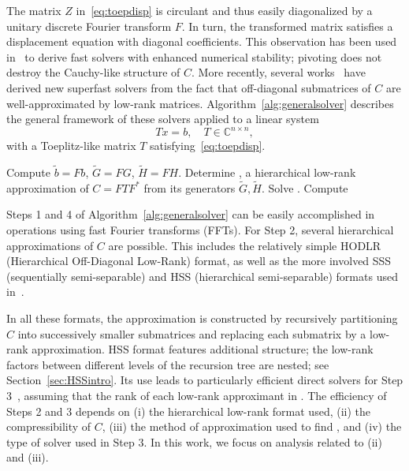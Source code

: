\documentclass[final,reqno,onefignum,onetabnum]{siamart190516}
\begin{document}
The matrix $Z$ in~\eqref{eq:toepdisp} is circulant and thus easily diagonalized by a unitary discrete Fourier transform $F$. In turn, the transformed matrix   satisfies a displacement equation with diagonal coefficients. This observation has been used in~\cite{gohberg1995fast} to derive fast solvers with enhanced numerical stability; pivoting does not destroy the Cauchy-like structure of $C$. More recently, several works~\cite{chandrasekaran2007superfast, martinsson2005fast, xia2012superfast} have derived new superfast solvers from the fact that off-diagonal submatrices of $C$ are well-approximated by low-rank matrices. Algorithm~\ref{alg:generalsolver} describes the general framework of these solvers applied to a linear system
\begin{equation}
\label{eq:tls}
Tx = b, \quad T \in \mathbb{C}^{n \times n}, 
\end{equation}
with a Toeplitz-like matrix $T$  satisfying~\eqref{eq:toepdisp}.
\begin{algorithm}[t!]
\caption{Superfast solvers for a Toeplitz-like linear system~\eqref{eq:tls}.}
\label{alg:generalsolver}
\begin{algorithmic}[1]
\State Compute $\widetilde{b} = Fb$, $\widetilde{G} = FG$, $\widetilde{H} = FH$. 
\State Determine , a hierarchical low-rank approximation of $C = FTF^*$ from its generators $\widetilde{G}, \widetilde{H}$. 
\State Solve . 
\State Compute  
\end{algorithmic}
\end{algorithm}


Steps 1 and 4 of Algorithm~\ref{alg:generalsolver} can be easily accomplished in  operations using fast Fourier transforms (FFTs). 
 For Step 2, several hierarchical approximations of $C$ are possible. This includes the relatively simple HODLR (Hierarchical Off-Diagonal Low-Rank) format, as well as the more involved SSS (sequentially semi-separable) and HSS (hierarchical semi-separable) formats used in~\cite{chandrasekaran2007superfast,martinsson2011fast, xia2012superfast}.
 
 In all these formats, the approximation  is constructed by recursively partitioning $C$ into successively smaller submatrices and replacing each submatrix by a low-rank approximation. HSS format features additional structure; the low-rank factors between different levels of the recursion tree are nested; see Section~\ref{sec:HSSintro}. 
Its use leads to particularly efficient  direct solvers for Step 3~\cite{chandrasekaran2006fast,xia2012superfast}, 
assuming that the rank of each low-rank approximant in .
The efficiency of Steps 2 and 3 depends on (i) the hierarchical low-rank format used, (ii) the compressibility of $C$,  (iii) the method of approximation used to find  , and (iv) the type of solver used in Step 3. 
In this work, we focus on analysis related to (ii) and (iii).  
\end{document}
